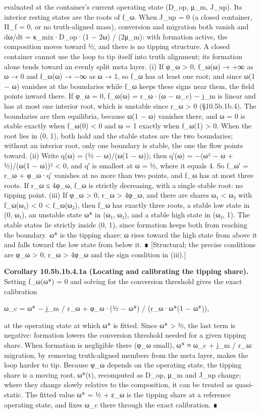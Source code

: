 \documentclass[
]{article}
\begin{document}
evaluated at the container's current operating state (D\_op, μ\_m,
J\_up). Its interior resting states are the roots of f\_ω. When J\_up =
0 (a closed container, Π\_f = 0, or no truth-aligned mass), conversion
and migration both vanish and dω/dt = κ\_mix·D\_op·(1 − 2ω) / (2μ\_m):
with formation active, the composition moves toward ½, and there is no
tipping structure. A closed container cannot use the loop to tip itself
into truth alignment; its formation alone tends toward an evenly split
meta layer. (i) If φ\_ω \textgreater{} 0, f\_ω(ω) → +∞ as ω → 0 and
f\_ω(ω) → −∞ as ω → 1, so f\_ω has at least one root; and since ω(1 − ω)
vanishes at the boundaries while f\_ω keeps these signs near them, the
field points inward there. If φ\_ω = 0, f\_ω(ω) = r\_ω·(ω − ω\_c) − j\_m
is linear and has at most one interior root, which is unstable since
r\_ω \textgreater{} 0 (§10.5b.1b.4). The boundaries are then equilibria,
because ω(1 − ω) vanishes there, and ω = 0 is stable exactly when
f\_ω(0) \textless{} 0 and ω = 1 exactly when f\_ω(1) \textgreater{} 0.
When the root lies in (0, 1), both hold and the stable states are the
two boundaries; without an interior root, only one boundary is stable,
the one the flow points toward. (ii) Write q(ω) = (½ − ω)/(ω(1 − ω));
then q′(ω) = −(ω² − ω + ½)/(ω(1 − ω))² \textless{} 0, and
\textbar q′\textbar{} is smallest at ω = ½, where it equals 4. So f\_ω′
= r\_ω + φ\_ω·q′ vanishes at no more than two points, and f\_ω has at
most three roots. If r\_ω ≤ 4φ\_ω, f\_ω is strictly decreasing, with a
single stable root: no tipping point. (iii) If φ\_ω \textgreater{} 0,
r\_ω \textgreater{} 4φ\_ω, and there are shares ω₁ \textless{} ω₂ with
f\_ω(ω₁) \textless{} 0 \textless{} f\_ω(ω₂), then f\_ω has exactly three
roots, a stable low state in (0, ω₁), an unstable state ω* in (ω₁, ω₂),
and a stable high state in (ω₂, 1). The stable states lie strictly
inside (0, 1), since formation keeps both from reaching the boundary. ω*
is the tipping share: ω rises toward the high state from above it and
falls toward the low state from below it. ∎ {[}Structural; the precise
conditions are φ\_ω \textgreater{} 0, r\_ω \textgreater{} 4φ\_ω and the
sign condition in (iii).{]}

\textbf{Corollary 10.5b.1b.4.1a (Locating and calibrating the tipping
share).} Setting f\_ω(ω*) = 0 and solving for the conversion threshold
gives the exact calibration

ω\_c = ω* − j\_m / r\_ω + φ\_ω·(½ − ω*) / (r\_ω·ω*(1 − ω*)),

at the operating state at which ω* is fitted. Since ω* \textgreater{} ½,
the last term is negative: formation lowers the conversion threshold
needed for a given tipping share. When formation is negligible there
(φ\_ω small), ω* ≈ ω\_c + j\_m / r\_ω: migration, by removing
truth-aligned members from the meta layer, makes the loop harder to tip.
Because φ\_ω depends on the operating state, the tipping share is a
moving root, ω*(t), recomputed as D\_op, μ\_m and J\_up change; where
they change slowly relative to the composition, it can be treated as
quasi-static. The fitted value ω* = ½ + ε\_ω is the tipping share at a
reference operating state, and fixes ω\_c there through the exact
calibration. ∎
\end{document}
